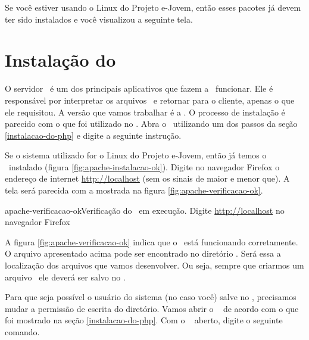 Se você estiver usando o Linux do Projeto e-Jovem, então esses pacotes já devem
ter sido instalados e você visualizou a seguinte tela.


\section{Instalação do \apache}
\label{instalacao-do-apache}

O servidor \apache~é um dos principais aplicativos que fazem a \web~funcionar.
Ele é responsável por interpretar os arquivos \phpextensao~e retornar para o
cliente, apenas o que ele requisitou. A versão que vamos trabalhar é a \apacheversao.
O processo de instalação é parecido com o que foi utilizado no \php. Abra o
\terminal~utilizando um dos passos da seção \ref{instalacao-do-php} e digite a 
seguinte instrução.



Se o sistema utilizado for o Linux do Projeto e-Jovem, então já temos o \apache
\apacheversao~instalado (figura \ref{fig:apache-instalacao-ok}). Digite no navegador 
Firefox o endereço de internet \url{http://localhost} (sem os sinais de maior e menor que). 
A tela será parecida com a mostrada na figura \ref{fig:apache-verificacao-ok}.

			{apache-verificacao-ok}{Verificação do \apache~em execução. Digite \url{http://localhost} no navegador Firefox}

A figura \ref{fig:apache-verificacao-ok} indica que o \apache~está funcionando corretamente.
O arquivo apresentado acima pode ser encontrado no diretório \dirpadrao. Será 
essa a localização dos arquivos que vamos desenvolver. Ou seja, sempre que criarmos
um arquivo \phpextensao~ele deverá ser salvo no \dirpadrao. 

Para que seja possível o usuário do sistema (no caso você) salve no \dirpadrao,
precisamos mudar a permissão de escrita do diretório. Vamos abrir o \terminal~
de acordo com o que foi mostrado na seção \ref{instalacao-do-php}. Com o \terminal~
aberto, digite o seguinte comando.

